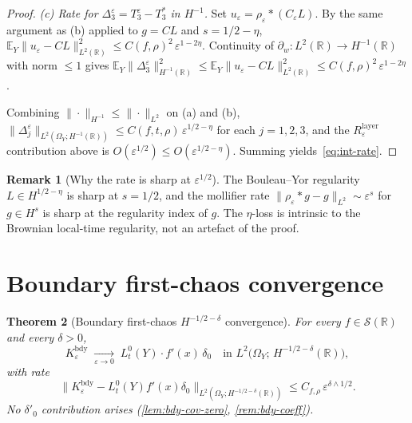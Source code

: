 \documentclass[11pt,reqno]{amsart}
\theoremstyle{plain}
\newtheorem{theorem}{Theorem}[section]
\theoremstyle{definition}
\newtheorem{remark}[theorem]{Remark}
\theoremstyle{remark}
\newcommand{\R}{\mathbb{R}}
\newcommand{\E}{\mathbb{E}}
\begin{document}
\begin{proof}
\smallskip\noindent\emph{(c) Rate for
$\Delta_{3}^{\varepsilon}=T_{3}^{\varepsilon}-T_{3}^{*}$ in
$H^{-1}$.}
Set $u_{\varepsilon}=\rho_{\varepsilon}*(C_{\varepsilon}L)$. By the
same argument as (b) applied to $g=CL$ and $s=1/2-\eta$,
$\E_{Y}\|u_{\varepsilon}-CL\|_{L^{2}(\R)}^{2}\le
C(f,\rho)^{2}\,\varepsilon^{1-2\eta}$. Continuity of
$\partial_{w}\colon L^{2}(\R)\to H^{-1}(\R)$ with norm $\le 1$ gives
$\E_{Y}\|\Delta_{3}^{\varepsilon}\|_{H^{-1}(\R)}^{2}\le
\E_{Y}\|u_{\varepsilon}-CL\|_{L^{2}(\R)}^{2}\le
C(f,\rho)^{2}\,\varepsilon^{1-2\eta}$.

\smallskip Combining
$\|\cdot\|_{H^{-1}}\le\|\cdot\|_{L^{2}}$ on (a) and (b),
$\|\Delta_{j}^{\varepsilon}\|_{L^{2}(\Omega_{Y};H^{-1}(\R))}\le
C(f,t,\rho)\,\varepsilon^{1/2-\eta}$ for each $j=1,2,3$, and the
$R_{\varepsilon}^{\mathrm{layer}}$ contribution above is
$O(\varepsilon^{1/2})\le O(\varepsilon^{1/2-\eta})$. Summing
yields~\eqref{eq:int-rate}.
\end{proof}

\begin{remark}[Why the rate is sharp at
\texorpdfstring{$\varepsilon^{1/2}$}{epsilon\textasciicircum 1/2}]
The Bouleau--Yor regularity $L\in H^{1/2-\eta}$ is sharp at
$s=1/2$, and the mollifier rate
$\|\rho_{\varepsilon}*g-g\|_{L^{2}}\sim\varepsilon^{s}$ for
$g\in H^{s}$ is sharp at the regularity index of $g$. The
$\eta$-loss is intrinsic to the Brownian local-time regularity, not
an artefact of the proof.
\end{remark}

\section{Boundary first-chaos convergence}\label{sec:boundary}

\begin{theorem}[Boundary first-chaos
\texorpdfstring{$H^{-1/2-\delta}$}{H\textasciicircum-1/2-delta} convergence]
\label{thm:boundary}
For every $f\in\mathscr S(\R)$ and every $\delta>0$,
\[
 K_{\varepsilon}^{\mathrm{bdy}}\;\xrightarrow[\varepsilon\to 0]{}\;L_{t}^{0}(Y)\cdot f'(x)\,\delta_{0}
 \quad\text{in }L^{2}\bigl(\Omega_{Y};\,H^{-1/2-\delta}(\R)\bigr),
\]
with rate
\[
 \bigl\|K_{\varepsilon}^{\mathrm{bdy}}-L_{t}^{0}(Y)f'(x)\delta_{0}\bigr\|_{L^{2}(\Omega_{Y};H^{-1/2-\delta}(\R))}
 \le C_{f,\rho}\,\varepsilon^{\delta\wedge 1/2}.
\]
No $\delta'_{0}$ contribution arises (\cref{lem:bdy-cov-zero},
\cref{rem:bdy-coeff}).
\end{theorem}
\end{document}
